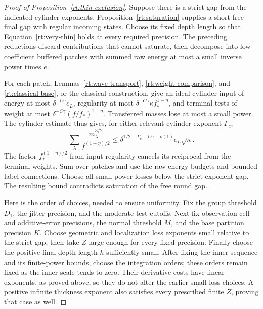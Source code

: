 \begin{proof}[Proof of Proposition~\ref{rt:thin-exclusion}]
Suppose there is a strict gap from the indicated cylinder exponents.
Proposition~\ref{rt:saturation} supplies a short free final gap with
regular incoming states.  Choose its fixed depth length so that
Equation~\eqref{rt:very-thin} holds at every required precision.
The preceding reductions discard contributions that cannot saturate,
then decompose into low-coefficient buffered patches with summed raw
energy at most a small inverse power times $e$.

For each patch, Lemmas~\ref{rt:wave-transport},
\ref{rt:weight-comparison}, and \ref{rt:classical-base}, or the
classical construction, give an ideal cylinder input of energy at most
$\delta^{-C\gamma}e_L$, regularity at most
$\delta^{-C\gamma}\kappa f_*^{1-\eta}$, and terminal tests of weight
at most $\delta^{-C\gamma}(f/f_*)^{1-\eta}$.
Transferred masses lose at most a small power.  The cylinder estimate
thus gives, for either relevant cylinder exponent $\Gamma_c$,
\[
 \sum_\lambda \frac{m_\lambda^{3/2}}{f^{(1-\eta)/2}}
 \le\delta^{1/2-\Gamma_c-C\gamma-o(1)}e_L\sqrt\kappa.
\]
The factor $f_*^{(1-\eta)/2}$ from input regularity cancels its
reciprocal from the terminal weights.  Sum over patches and use the
raw energy budgets and bounded label connections.  Choose all
small-power losses below the strict exponent gap.  The resulting
bound contradicts saturation of the free round gap.

Here is the order of choices, needed to ensure uniformity.  Fix the
group threshold $D_1$, the jitter precision, and the moderate-test
cutoffs.  Next fix observation-cell and additive-error precisions,
the normal threshold $M$, and the base partition precision $K$.
Choose geometric and localization loss exponents small relative to
the strict gap, then take $Z$ large enough for every fixed precision.
Finally choose the positive final depth length $h$ sufficiently small.
After fixing the inner sequence and its finite-power bounds, choose
the integration orders; these orders remain fixed as the inner scale
tends to zero.  Their derivative
costs have linear exponents, as proved above, so they do not alter
the earlier small-loss choices.  A positive infinite thickness
exponent also satisfies every prescribed finite $Z$, proving that
case as well.
\end{proof}
